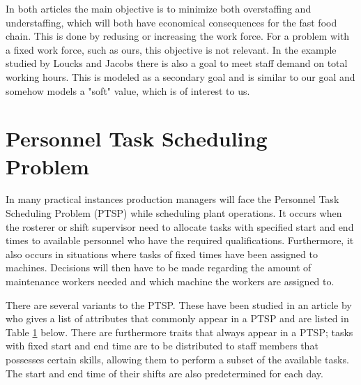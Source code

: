 In both articles the main objective is to minimize both overstaffing and understaffing, which will both have economical consequences for the fast food chain. This is done by redusing or increasing the work force. For a problem with a fixed work force, such as ours, this objective is not relevant. In the example studied by Loucks and Jacobs there is also a goal to meet staff demand on total working hours. This is modeled as a secondary goal and is similar to our goal and somehow models a "soft" value, which is of interest to us.






\section{Personnel Task Scheduling Problem} \label{PTSP}

In many practical instances production managers will face the Personnel Task Scheduling Problem (PTSP) while scheduling plant operations. It occurs when the rosterer or shift supervisor need to allocate tasks with specified start and end times to available personnel who have the required qualifications. Furthermore, it also occurs in situations where tasks of fixed times have been assigned to machines. Decisions will then have to be made regarding the amount of maintenance workers needed and which machine the workers are assigned to. \cite{krishnamoorthy_2001}

There are several variants to the PTSP. These have been studied in an article by \cite{krishnamoorthy_2001} who gives a list of attributes that commonly appear in a PTSP and are listed in Table \ref{PTSP} below. There are furthermore traits that always appear in a PTSP; tasks with fixed start and end time are to be distributed to staff members that possesses certain skills, allowing them to perform a subset of the available tasks. The start and end time of their shifts are also predetermined for each day.


